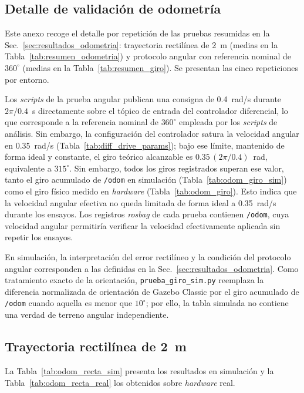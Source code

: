 \begin{appendices}
\section{Detalle de validación de odometría}
\label{anx:odometria_detalle}

Este anexo recoge el detalle por repetición de las pruebas resumidas en la Sec.~\ref{sec:resultados_odometria}: trayectoria rectilínea de 2~m (medias en la Tabla~\ref{tab:resumen_odometria}) y protocolo angular con referencia nominal de $360^\circ$ (medias en la Tabla~\ref{tab:resumen_giro}). Se presentan las cinco repeticiones por entorno.

Los \textit{scripts} de la prueba angular publican una consigna de 0.4~rad/s durante
$2\pi/0.4$~s directamente sobre el tópico de entrada del controlador
diferencial, lo que corresponde a la referencia nominal de $360^\circ$
empleada por los \textit{scripts} de análisis. Sin embargo, la configuración del
controlador satura la velocidad angular en 0.35~rad/s
(Tabla~\ref{tab:diff_drive_params}); bajo ese límite, mantenido de forma
ideal y constante, el giro teórico alcanzable es
$0.35\,(2\pi/0.4)$~rad, equivalente a $315^\circ$. Sin embargo, todos los giros registrados superan ese valor, tanto el giro acumulado de \texttt{/odom} en simulación (Tabla~\ref{tab:odom_giro_sim}) como el giro físico medido en \textit{hardware} (Tabla~\ref{tab:odom_giro}). Esto indica que la velocidad angular efectiva no queda limitada de forma ideal a 0.35~rad/s durante los ensayos. Los registros \textit{rosbag} de cada prueba contienen \texttt{/odom}, cuya velocidad angular permitiría verificar la velocidad efectivamente aplicada sin repetir los ensayos.

En simulación, la interpretación del error rectilíneo y la condición del protocolo angular corresponden a las definidas en la Sec.~\ref{sec:resultados_odometria}. Como tratamiento exacto de la orientación, \texttt{prueba\_giro\_sim.py} reemplaza la diferencia normalizada de orientación de Gazebo Classic por el giro acumulado de \texttt{/odom} cuando aquella es menor que $10^\circ$; por ello, la tabla simulada no contiene una verdad de terreno angular independiente.

\subsection{Trayectoria rectilínea de 2~m}

La Tabla~\ref{tab:odom_recta_sim} presenta los resultados en simulación y la
Tabla~\ref{tab:odom_recta_real} los obtenidos sobre \textit{hardware} real.


\end{appendices}

